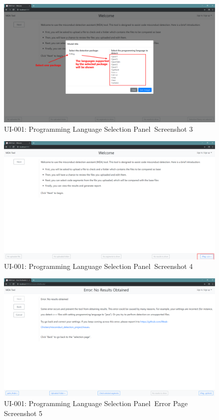 \documentclass[twoside,a4paper]{refart}
\newcommand{\bugfirst}{UI-001: Programming Language Selection Panel}
\begin{document}
\begin{figure}[!h]
\centering
\includegraphics[width=12cm]{img/bug_1-3.png}
\caption{\bugfirst $\ $ Screenshot 3}
\label{fig:bug1_3}
\end{figure}

\begin{figure}[!h]
\centering
\includegraphics[width=12cm]{img/bug_1-4.png}
\caption{\bugfirst $\ $ Screenshot 4}
\label{fig:bug1_4}
\end{figure}

\clearpage

\begin{figure}[!h]
\centering
\includegraphics[width=12cm]{img/bug_1-5.png}
\caption{\bugfirst $\ $ Error Page Screenshot 5}
\label{fig:bug1_5}
\end{figure}
\end{document}
